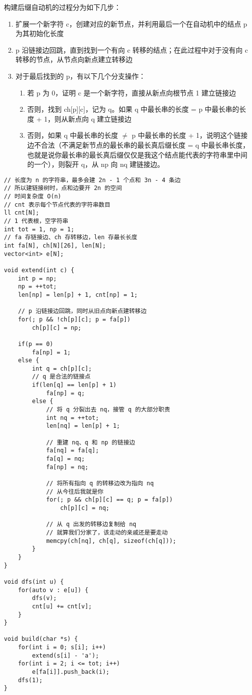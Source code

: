 \documentclass[UTF8]{article}
\begin{document}
构建后缀自动机的过程分为如下几步：
\begin{enumerate}
	\item 扩展一个新字符 c，创建对应的新节点，并利用最后一个在自动机中的结点 p 为其初始化长度
	\item p 沿链接边回跳，直到找到一个有向 c 转移的结点；在此过程中对于没有向 c 转移的节点，从节点向新点建立转移边
	\item 对于最后找到的 p，有以下几个分支操作：
		\begin{enumerate}
			\item 若 p 为 0，证明 c 是一个新字符，直接从新点向根节点 1 建立链接边
			\item 否则，找到 ch[p][c]，记为 q。如果 q 中最长串的长度 = p 中最长串的长度 + 1，则从新点向 q 建立链接边
			\item 否则，如果 q 中最长串的长度 $\mathrm{\neq}$ p 中最长串的长度 + 1，说明这个链接边不合法（不满足新节点的最长串的最长真后缀长度 = q 中最长串长度，也就是说你最长串的最长真后缀仅仅是我这个结点能代表的字符串里中间的一个），则裂开 q，从 np 向 nq 建链接边。
		\end{enumerate}
\end{enumerate}

\begin{lstlisting}[caption=后缀自动机]
// 长度为 n 的字符串，最多会建 2n - 1 个点和 3n - 4 条边
// 所以建链接树时，点和边要开 2n 的空间
// 时间复杂度 O(n)
// cnt 表示每个节点代表的字符串数目
ll cnt[N];
// 1 代表根，空字符串
int tot = 1, np = 1;
// fa 存链接边、ch 存转移边，len 存最长长度
int fa[N], ch[N][26], len[N];
vector<int> e[N];

void extend(int c) {
	int p = np;
	np = ++tot;
	len[np] = len[p] + 1, cnt[np] = 1;

	// p 沿链接边回跳，同时从旧点向新点建转移边
	for(; p && !ch[p][c]; p = fa[p])
		ch[p][c] = np;
	
	if(p == 0)
		fa[np] = 1;
	else {
		int q = ch[p][c];
		// q 是合法的链接点
		if(len[q] == len[p] + 1)
			fa[np] = q;
		else {
			// 将 q 分裂出去 nq，接管 q 的大部分职责
			int nq = ++tot;
			len[nq] = len[p] + 1;

			// 重建 nq、q 和 np 的链接边
			fa[nq] = fa[q];
			fa[q] = nq;
			fa[np] = nq;

			// 将所有指向 q 的转移边改为指向 nq
			// 从今往后我就是你
			for(; p && ch[p][c] == q; p = fa[p])
				ch[p][c] = nq;
			
			// 从 q 出发的转移边复制给 nq
			// 就算我们分家了，该走动的亲戚还是要走动
			memcpy(ch[nq], ch[q], sizeof(ch[q]));
		}
	}
}

void dfs(int u) {
	for(auto v : e[u]) {
		dfs(v);
		cnt[u] += cnt[v];
	}
}

void build(char *s) {
	for(int i = 0; s[i]; i++)
		extend(s[i] - 'a');
	for(int i = 2; i <= tot; i++)
		e[fa[i]].push_back(i);
	dfs(1);
}
\end{lstlisting}
\end{document}
